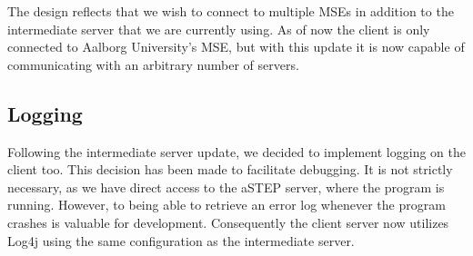 The design reflects that we wish to connect to multiple MSEs in addition to the intermediate server that we are currently using. As of now the client is only connected to Aalborg University's MSE, but with this update it is now capable of communicating with an arbitrary number of servers.

\subsection{Logging}
Following the intermediate server update, we decided to implement logging on the client too. This decision has been made to facilitate debugging. It is not strictly necessary, as we have direct access to the aSTEP server, where the program is running. However, to being able to retrieve an error log whenever the program crashes is valuable for development. Consequently the client server now utilizes Log4j \cite{log4j} using the same configuration as the intermediate server.